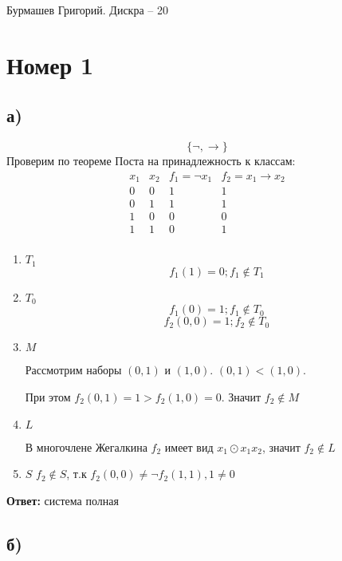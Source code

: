 \documentclass[a4paper,12pt]{article}
\author{Бурмашев Григорий, БПМИ-208}
\title{}
\date{\today}
\begin{document}
\begin{center}
Бурмашев Григорий. Дискра -- 20
\end{center}
\section*{Номер 1}
\subsection*{а)}
\[
\{\neg, \rightarrow \}
\]
Проверим по теореме Поста на принадлежность к классам:
\[
\begin{matrix}
x_1 & x_2 & f_1  = \neg x_1 &f_2 = x_1  \rightarrow x_ 2 \\
0 & 0 & 1 & 1 \\
0 & 1 & 1 & 1\\
1 & 0 & 0 & 0 \\
1 & 1 & 0  & 1 \\
\end{matrix}
\]
\begin{enumerate}
\item $T_1$
\[f_1 (1) = 0; f_1 \notin T_1
\]
\item $T_0$
\[
f_1(0) = 1; f_1 \notin T_0
\]
\[
f_2(0, 0) = 1; f_2 \notin T_0
\]
\item $M$

Рассмотрим наборы $(0, 1)$  и $(1, 0)$. $(0, 1) < (1, 0)$. 

При этом $f_2(0, 1) = 1 > f_2(1, 0) = 0$. Значит $f_2 \notin M$

\item $L$

В многочлене Жегалкина $f_2$ имеет вид $x_1 \odot x_1x_2$, значит $f_2 \notin L$
\item $S$
$f_2 \notin S$, т.к $f_2(0, 0) \neq \neg f_2(1, 1), 1 \neq 0$
 \end{enumerate}
\begin{center}
\textbf{Ответ: } система полная
\end{center}
\subsection*{б)}
\end{document}
